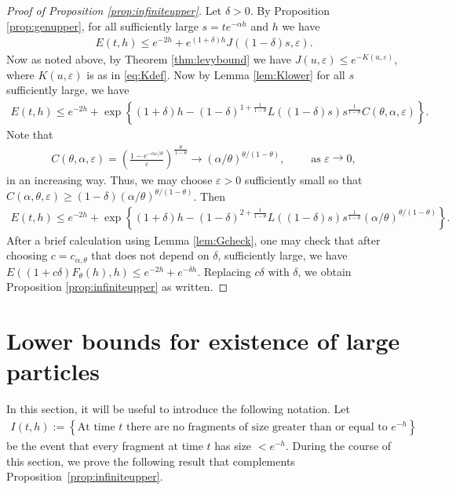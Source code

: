 \documentclass[a4,12pt]{amsart}
\numberwithin{equation}{section}
\begin{document}
	\begin{proof}[Proof of Proposition \ref{prop:infiniteupper}]
		Let $\delta > 0$. 
		By Proposition \ref{prop:genupper}, for all sufficiently large 
		$s = te^{-\alpha h}$ and $h$ we have 
		\begin{align*}
			E(t,h) \leq e^{-2h} + e^{(1+\delta)h} J((1-\delta)s , \varepsilon) .
		\end{align*}
		Now as noted above, by Theorem \ref{thm:levybound} we 
		have $J(u,\varepsilon) \leq e^{ - K(u,\varepsilon)}$, where 
		$K(u,\varepsilon)$ is as in \eqref{eq:Kdef}. 
		Now by Lemma \ref{lem:Klower} for all $s$ sufficiently large, we have
		\begin{align*}
			E(t,h) \leq 
			e^{-2h} + \exp \left\{ (1 + \delta)h - (1-\delta)^{1+\frac{1}{1-\theta}} 
			L((1-\delta)s) s^{\frac{1}{1-\theta}} C(\theta,\alpha,\varepsilon) \right\}. 
		\end{align*}
		Note that 
		\begin{align*}
			C(\theta,\alpha,\varepsilon) = 
			\left( \frac{1-e^{ - \alpha  \varepsilon/\theta} }{ \varepsilon} \right)^{\frac{\theta}{1-\theta}} \to (\alpha/\theta)^{\theta/(1-\theta)}, \qquad \mbox{ as } \varepsilon\rightarrow 0,
		\end{align*}
		in an increasing way. Thus, we may choose $\varepsilon>0$ sufficiently 
		small so that $C(\alpha,\theta,\varepsilon) \geq (1-\delta)(\alpha/\theta)^{\theta/(1-\theta)}$. Then
		\begin{align*}
			E(t,h) \leq e^{-2h} + \exp \left\{ (1 + \delta)h - (1-\delta)^{2+\frac{1}{1-\theta}}L((1-\delta)s)
            s^{\frac{1}{1-\theta}}( \alpha/\theta)^{\theta/(1-\theta)} \right\}. 
		\end{align*}
		After a brief calculation using Lemma \ref{lem:Gcheck}, one may check that after 
		choosing $c = c_{\alpha,\theta}$ that does not depend on $\delta$, sufficiently large,  we have 
		$E((1+c\delta)F_\theta(h),h) \leq e^{ - 2 h}+e^{ - \delta h}$. 
		Replacing $c \delta$ with $\delta$, we obtain Proposition \ref{prop:infiniteupper} as written.

\end{proof}

\section{Lower bounds for existence of large particles} \label{sec:lower}

	In this section, it will be useful to introduce the following notation. Let
	\begin{align*}
		I(t,h) := \left\{ \text{At time $t$ there are no fragments of size greater than or equal to $e^{-h}$} \right\}
	\end{align*}
    	be the event that every fragment at time $t$ has size $< e^{-h}$. 
    	During the course of this section, 
	we prove the following result that complements Proposition~\ref{prop:infiniteupper}.
\end{document}

